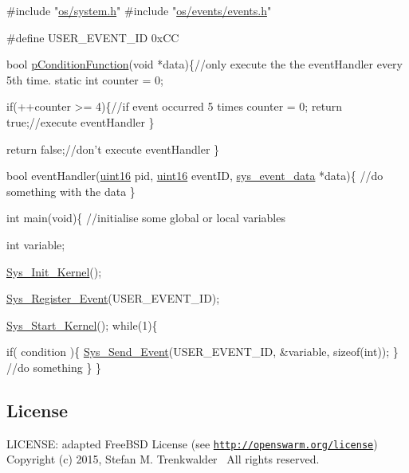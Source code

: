 \begin{DoxyCode}
\textcolor{preprocessor}{#include "\hyperlink{system_8h}{os/system.h}"}
\textcolor{preprocessor}{#include "\hyperlink{events_8h}{os/events/events.h}"}

\textcolor{preprocessor}{#define USER\_EVENT\_ID 0xCC}

\textcolor{keywordtype}{bool} \hyperlink{events_8h_a653a4a4b7d9f5a65e1415365267a9d9e}{pConditionFunction}(\textcolor{keywordtype}{void} *data)\{\textcolor{comment}{//only execute the the eventHandler every 5th time.}
     \textcolor{keyword}{static} \textcolor{keywordtype}{int} counter = 0;

     \textcolor{keywordflow}{if}(++counter >= 4)\{\textcolor{comment}{//if event occurred 5 times}
         counter = 0;
         \textcolor{keywordflow}{return} \textcolor{keyword}{true};\textcolor{comment}{//execute eventHandler}
     \}

    \textcolor{keywordflow}{return} \textcolor{keyword}{false};\textcolor{comment}{//don't execute eventHandler}
\}

\textcolor{keywordtype}{bool} eventHandler(\hyperlink{definitions_8h_a05f6b0ae8f6a6e135b0e290c25fe0e4e}{uint16} pid, \hyperlink{definitions_8h_a05f6b0ae8f6a6e135b0e290c25fe0e4e}{uint16} eventID, \hyperlink{structsys__event__data__s}{sys\_event\_data} *data)\{
     \textcolor{comment}{//do something with the data}
\}

\textcolor{keywordtype}{int} main(\textcolor{keywordtype}{void})\{
 \textcolor{comment}{//initialise some global or local variables}

 \textcolor{keywordtype}{int} variable;

    \hyperlink{system_8c_a31ce626d506c2b262ecf5b23946f522f}{Sys\_Init\_Kernel}();

 \hyperlink{events_8c_a386acd8573c1118d80986721664d2689}{Sys\_Register\_Event}(USER\_EVENT\_ID);
     
 \hyperlink{system_8c_a2e15518324643f26cb240108259b30da}{Sys\_Start\_Kernel}();      
    \textcolor{keywordflow}{while}(1)\{

     \textcolor{keywordflow}{if}( condition )\{
          \hyperlink{events_8c_a24dadcefc1b4c45c50fb351efc8e841c}{Sys\_Send\_Event}(USER\_EVENT\_ID, &variable, \textcolor{keyword}{sizeof}(\textcolor{keywordtype}{int}));
     \}
     \textcolor{comment}{//do something}
    \}
\}
\end{DoxyCode}
\hypertarget{group__events_events_license}{}\subsection{License}\label{group__events_events_license}
L\+I\+C\+E\+N\+S\+E\+: adapted Free\+B\+S\+D License (see \href{http://openswarm.org/license}{\tt http\+://openswarm.\+org/license})~\newline
Copyright (c) 2015, Stefan M. Trenkwalder~\newline
All rights reserved. 
